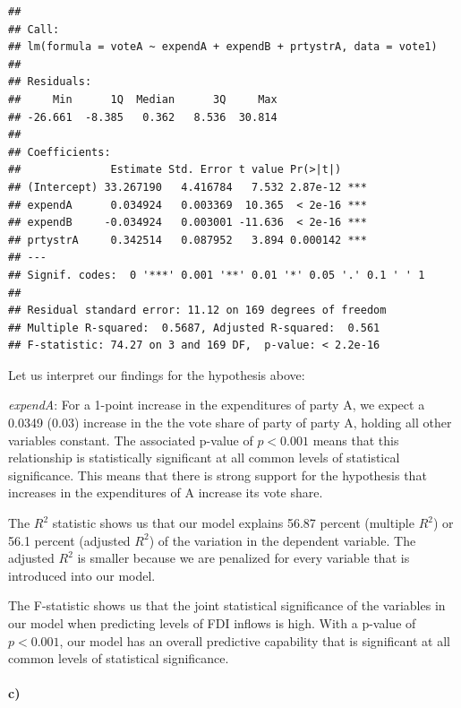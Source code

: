 \documentclass[12pt]{article}\usepackage[]{graphicx}\usepackage[]{color}
\makeatletter
\newenvironment{kframe}{%
 \def\at@end@of@kframe{}%
 \ifinner\ifhmode%
  \def\at@end@of@kframe{\end{minipage}}%
  \begin{minipage}{\columnwidth}%
 \fi\fi%
 \def\FrameCommand##1{\hskip\@totalleftmargin \hskip-\fboxsep
 \colorbox{shadecolor}{##1}\hskip-\fboxsep
     \hskip-\linewidth \hskip-\@totalleftmargin \hskip\columnwidth}%
 \MakeFramed {\advance\hsize-\width
   \@totalleftmargin\z@ \linewidth\hsize
   \@setminipage}}%
 {\par\unskip\endMakeFramed%
 \at@end@of@kframe}
\newenvironment{knitrout}{}{} %
\makeatother
\begin{document}
\begin{knitrout}
\begin{kframe}
\begin{verbatim}
## 
## Call:
## lm(formula = voteA ~ expendA + expendB + prtystrA, data = vote1)
## 
## Residuals:
##     Min      1Q  Median      3Q     Max 
## -26.661  -8.385   0.362   8.536  30.814 
## 
## Coefficients:
##              Estimate Std. Error t value Pr(>|t|)    
## (Intercept) 33.267190   4.416784   7.532 2.87e-12 ***
## expendA      0.034924   0.003369  10.365  < 2e-16 ***
## expendB     -0.034924   0.003001 -11.636  < 2e-16 ***
## prtystrA     0.342514   0.087952   3.894 0.000142 ***
## ---
## Signif. codes:  0 '***' 0.001 '**' 0.01 '*' 0.05 '.' 0.1 ' ' 1
## 
## Residual standard error: 11.12 on 169 degrees of freedom
## Multiple R-squared:  0.5687,	Adjusted R-squared:  0.561 
## F-statistic: 74.27 on 3 and 169 DF,  p-value: < 2.2e-16
\end{verbatim}
\end{kframe}
\end{knitrout}

Let us interpret our findings for the hypothesis above:

\textit{expendA}: For a 1-point increase in the expenditures of party A, we expect a 0.0349 (0.03) increase in the the vote share of party of party A, holding all other variables constant. The associated p-value of $p < 0.001$ means that this relationship is statistically significant at all common levels of statistical significance. This means that there is strong support  for the hypothesis that increases in the expenditures of A increase its vote share.

The $R^2$ statistic shows us that our model explains 56.87 percent (multiple $R^2$) or 56.1 percent (adjusted $R^2$) of the variation in the dependent variable. The adjusted $R^2$ is smaller because we are penalized for every variable that is introduced into our model.

The F-statistic shows us that the joint statistical significance of the variables in our model when predicting levels of FDI inflows is high. With a p-value of $p < 0.001$, our model has an overall predictive capability that is significant at all common levels of statistical significance.

\paragraph{c)} 
\end{document}

